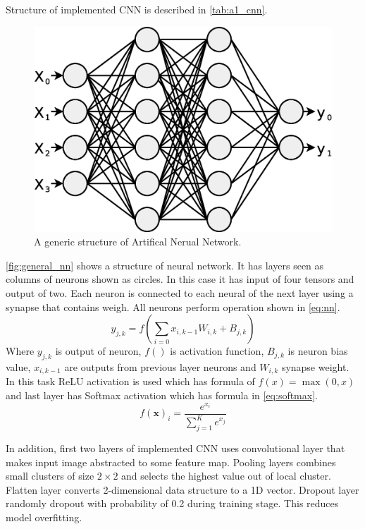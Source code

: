 \documentclass{article}
\begin{document}
Structure of implemented CNN is described in \autoref{tab:a1_cnn}.
\begin{figure}[htb]
	\centering
	\includegraphics[width=0.5\linewidth]{graphics/NN.eps}
	\caption{A generic structure of Artifical Nerual Network.}
	\label{fig:general_nn}	
\end{figure}
\autoref{fig:general_nn} shows a structure of neural network. It has layers seen as columns of neurons shown as circles. In this case it has input of four tensors and output of two. Each neuron is connected to each neural of the next layer using a synapse that contains weigh. All neurons perform operation shown in \autoref{eq:nn}.
\begin{equation}\label{eq:nn}
	y_{j,k} = f\left( \sum_{i=0} x_{i,k-1} W_{i,k} + B_{j,k} \right)
\end{equation}
Where $y_{j,k}$ is output of neuron, $f()$ is activation function, $B_{j,k}$ is neuron bias value, $x_{i,k-1}$ are outputs from previous layer neurons and $W_{i,k}$ synapse weight. In this task ReLU activation is used which has formula of $f(x) = \max(0, x)$ and last layer has Softmax activation which has formula in \autoref{eq:softmax}.
\begin{equation}\label{eq:softmax}
	f(\pmb{x})_i = \frac{e^{x_i}}{\sum_{j=1}^{K}e^{x_j}}
\end{equation}

In addition, first two layers of implemented CNN uses convolutional layer that makes input image abstracted to some feature map.
Pooling layers combines small clusters of size $2 \times 2$ and selects the highest value out of local cluster.
Flatten layer converts 2-dimensional data structure to a 1D vector.
Dropout layer randomly dropout with probability of 0.2 during training stage. This reduces model overfitting. 
\end{document}
